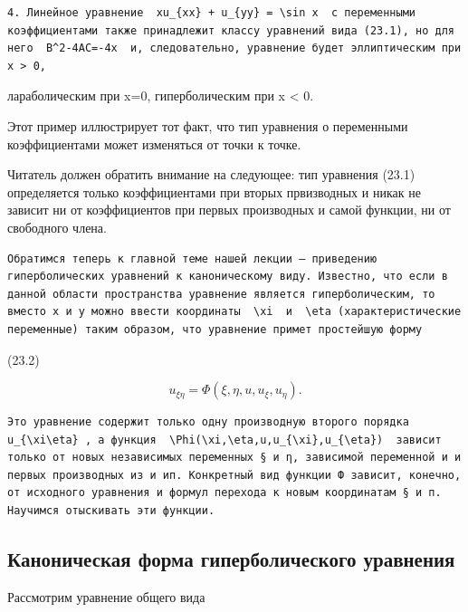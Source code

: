 \documentclass[
  ukrainian,
]{article}
\begin{document}
\begin{verbatim}
4. Линейное уравнение  xu_{xx} + u_{yy} = \sin x  с переменными коэффициентами также принадлежит классу уравнений вида (23.1), но для него  B^2-4AC=-4x  и, следовательно, уравнение будет эллиптическим при x > 0,
\end{verbatim}

лараболическим при x=0, гиперболическим при x \textless{} 0.

Этот пример иллюстрирует тот факт, что тип уравнения о переменными
коэффициентами может изменяться от точки к точке.

Читатель должен обратить внимание на следующее: тип уравнения (23.1)
определяется только коэффициентами при вторых првизводных и никак не
зависит ни от коэффициентов при первых производных и самой функции, ни
от свободного члена.

\begin{verbatim}
Обратимся теперь к главной теме нашей лекции — приведению гиперболических уравнений к каноническому виду. Известно, что если в данной области пространства уравнение является гиперболическим, то вместо x и y можно ввести координаты  \xi  и  \eta (характеристические переменные) таким образом, что уравнение примет простейшую форму
\end{verbatim}

(23.2)

\[
u_{\xi\eta} = \Phi(\xi, \eta, u, u_{\xi}, u_{\eta}).
\]

\begin{verbatim}
Это уравнение содержит только одну производную второго порядка  u_{\xi\eta} , а функция  \Phi(\xi,\eta,u,u_{\xi},u_{\eta})  зависит только от новых независимых переменных § и η, зависимой переменной и и первых производных из и ип. Конкретный вид функции Ф зависит, конечно, от исходного уравнения и формул перехода к новым координатам § и п. Научимся отыскивать эти функции.
\end{verbatim}

\subsection{Каноническая форма гиперболического
уравнения}\label{ux43aux430ux43dux43eux43dux438ux447ux435ux441ux43aux430ux44f-ux444ux43eux440ux43cux430-ux433ux438ux43fux435ux440ux431ux43eux43bux438ux447ux435ux441ux43aux43eux433ux43e-ux443ux440ux430ux432ux43dux435ux43dux438ux44f}

Рассмотрим уравнение общего вида
\end{document}
